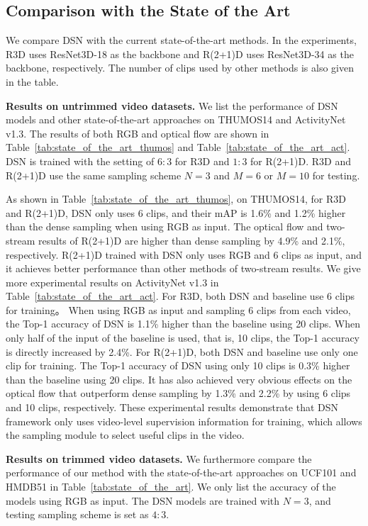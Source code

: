 \documentclass[journal]{IEEEtran}
\begin{document}
\subsection{Comparison with the State of the Art}
We compare DSN with the current state-of-the-art methods.
In the experiments, R3D uses ResNet3D-18 as the backbone and R(2+1)D uses ResNet3D-34 as the backbone, respectively.
The number of clips used by other methods is also given in the table.

\textbf{Results on untrimmed video datasets.}
We list the performance of DSN models and other state-of-the-art approaches on THUMOS14 and ActivityNet v1.3.
The results of both RGB and optical flow are shown in Table~\ref{tab:state_of_the_art_thumos} and Table~\ref{tab:state_of_the_art_act}.
DSN is trained with the setting of $6:3$ for R3D and $1:3$ for R(2+1)D.
R3D and R(2+1)D use the same sampling scheme $N=3$ and $M=6$ or $M=10$ for testing.

As shown in Table~\ref{tab:state_of_the_art_thumos}, on THUMOS14, for R3D and R(2+1)D, DSN only uses 6 clips, and their mAP is 1.6\% and 1.2\% higher than the dense sampling when using RGB as input.
The optical flow and two-stream results of R(2+1)D are higher than dense sampling by 4.9\% and 2.1\%, respectively.
R(2+1)D trained with DSN only uses RGB and 6 clips as input, and it achieves better performance than other methods of two-stream results.
We give more experimental results on ActivityNet v1.3 in Table~\ref{tab:state_of_the_art_act}.
For R3D, both DSN and baseline use 6 clips for training。
When using RGB as input and sampling 6 clips from each video, the Top-1 accuracy of DSN is 1.1\% higher than the baseline using 20 clips.
When only half of the input of the baseline is used, that is, 10 clips, the Top-1 accuracy is directly increased by 2.4\%.
For R(2+1)D, both DSN and baseline use only one clip for training.
The Top-1 accuracy of DSN using only 10 clips is 0.3\% higher than the baseline using 20 clips.
It has also achieved very obvious effects on the optical flow that outperform dense sampling by 1.3\% and 2.2\% by using 6 clips and 10 clips, respectively. These experimental results demonstrate that DSN framework only uses video-level supervision information for training, which allows the sampling module to select useful clips in the video.

\textbf{Results on trimmed video datasets.}
We furthermore compare the performance of our method with the state-of-the-art approaches on UCF101 and HMDB51 in Table~\ref{tab:state_of_the_art}.
We only list the accuracy of the models using RGB as input.
The DSN models are trained with $N=3$, and testing sampling scheme is set as $4:3$.
\end{document}
